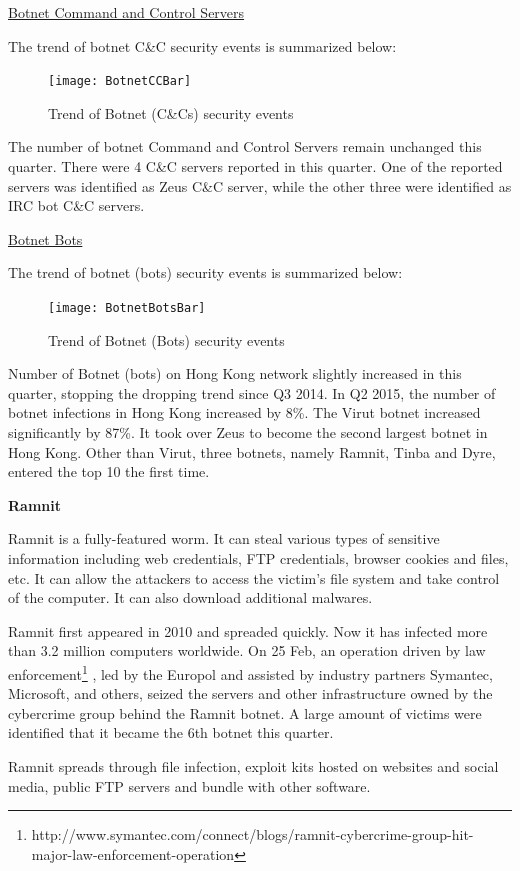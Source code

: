 \documentclass[12pt]{article}
\begin{document}
\underline{Botnet Command and Control Servers}

The trend of botnet C\&C security events is summarized below:
\begin{figure}[h!]
\centerline{\texttt{[image: BotnetCCBar]}}
\caption{Trend of Botnet (C\&Cs) security events}
\end{figure}
The number of botnet Command and Control Servers remain unchanged this quarter.
There were 4 C\&C servers reported in this quarter. One of the reported servers was identified as Zeus C\&C server, while the other three were identified as IRC bot C\&C servers.

\underline{Botnet Bots}

The trend of botnet (bots) security events is summarized below:
\begin{figure}[h!]
\centerline{\texttt{[image: BotnetBotsBar]}}
\caption{Trend of Botnet (Bots) security events}
\end{figure}
\FloatBarrier
Number of Botnet (bots) on Hong Kong network slightly increased in this quarter, stopping 
the dropping trend since Q3 2014. 
In Q2 2015, the number of botnet infections in Hong Kong increased by 8\%. The Virut botnet 
increased significantly by 87\%. It took over Zeus to become the second largest botnet in Hong 
Kong.
Other than Virut, three botnets, namely Ramnit, Tinba and Dyre, entered the top 10 the first 
time. 

\textbf{Ramnit} 

Ramnit is a fully-featured worm. It can steal various types of sensitive information including 
web credentials, FTP credentials, browser cookies and files, etc. It can allow the attackers to 
access  the  victim’s  file  system  and  take  control  of  the  computer.  It  can  also  download 
additional malwares. 

Ramnit first appeared in 2010 and spreaded quickly. Now it has infected more than 3.2 million 
computers  worldwide.  On  25  Feb,  an  operation  driven  by  law  enforcement\footnote{http://www.symantec.com/connect/blogs/ramnit-cybercrime-group-hit-major-law-enforcement-operation} ,  led  by  the 
Europol and assisted by industry partners Symantec, Microsoft, and others, seized the servers 
and other infrastructure owned by the cybercrime group behind the Ramnit botnet. A large 
amount of victims were identified that it became the 6th botnet this quarter. 

Ramnit spreads through file infection, exploit kits hosted on websites and social media, public FTP servers and bundle with other software.
\end{document}
